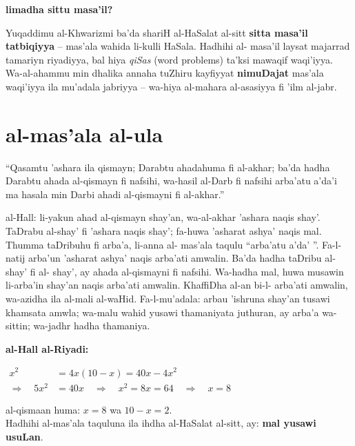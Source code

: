\documentclass[11pt,a4paper]{book}
\begin{document}
\begin{commentary}
\textbf{limadha sittu masa'il?}

Yuqaddimu al-Khwarizmi ba'da shariH al-HaSalat al-sitt \textbf{sitta
masa'il tatbiqiyya} -- mas'ala wahida li-kulli HaSala. Hadhihi al-
masa'il laysat majarrad tamariyn riyadiyya, bal hiya \textit{qiSas}
(word problems) ta'ksi mawaqif waqi'iyya. Wa-al-ahammu min dhalika
annaha tuZhiru kayfiyyat \textbf{nimuDajat} mas'ala waqi'iyya ila
mu'adala jabriyya -- wa-hiya al-mahara al-asasiyya fi 'ilm al-jabr.
\end{commentary}

\section*{al-mas'ala al-ula}

\begin{originaltext}
``Qasamtu 'ashara ila qismayn; Darabtu ahadahuma fi al-akhar; ba'da
hadha Darabtu ahada al-qismayn fi nafsihi, wa-hasil al-Darb fi
nafsihi arba'atu a'da'i ma hasala min Darbi ahadi al-qismayni fi
al-akhar.''

al-Hall: li-yakun ahad al-qismayn shay'an, wa-al-akhar 'ashara
naqis shay'. TaDrabu al-shay' fi 'ashara naqis shay'; fa-huwa
'asharat ashya' naqis mal. Thumma taDribuhu fi arba'a, li-anna al-
mas'ala taqulu ``arba'atu a'da' ''. Fa-l-natij arba'un 'asharat
ashya' naqis arba'ati amwalin. Ba'da hadha taDribu al-shay' fi al-
shay', ay ahada al-qismayni fi nafsihi. Wa-hadha mal, huwa musawin
li-arba'in shay'an naqis arba'ati amwalin. KhaffiDha al-an bi-l-
arba'ati amwalin, wa-azidha ila al-mali al-waHid. Fa-l-mu'adala:
arbau 'ishruna shay'an tusawi khamsata amwla; wa-malu wahid
yusawi thamaniyata juthuran, ay arba'a wa-sittin; wa-jadhr hadha
thamaniya.
\end{originaltext}

\begin{mathexplain}
\textbf{al-Hall al-Riyadi:}

\begin{center}
$\begin{aligned}
  x^2 &= 4x(10-x) = 40x - 4x^2 \\
  \Rightarrow\quad 5x^2 &= 40x \quad\Rightarrow\quad x^2 = 8x = 64 \quad\Rightarrow\quad x = 8
\end{aligned}$
\end{center}

al-qismaan huma: $x = 8$ wa $10 - x = 2$.\\
Hadhihi al-mas'ala taquluna ila ihdha al-HaSalat al-sitt, ay:
\textbf{mal yusawi usuLan}.
\end{mathexplain}
\end{document}
